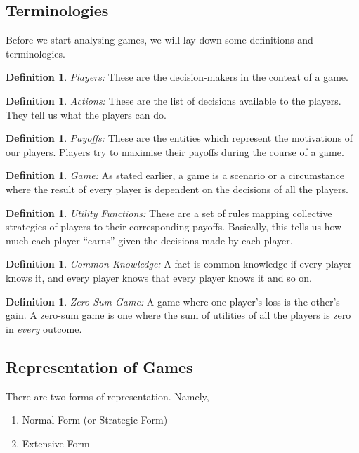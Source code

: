 \documentclass{article}
\theoremstyle{definition}
\newtheorem{defn}[theorem]{Definition}
\begin{document}
\subsection{Terminologies}

Before we start analysing games, we will lay down some definitions and terminologies.

\begin{defn}
\textit{Players:} These are the decision-makers in the context of a game. 
\end{defn}
\begin{defn}
\textit{Actions:} These are the list of decisions available to the players. They tell us what the players can do.
\end{defn}
\begin{defn}
\textit{Payoffs:} These are the entities which represent the motivations of our players. Players try to maximise their payoffs during the course of a game.
\end{defn}
\begin{defn}
\textit{Game:} As stated earlier, a game is a scenario or a circumstance where the result of every player is dependent on the decisions of all the players.
\end{defn}
\begin{defn}
\textit{Utility Functions:} These are a set of rules mapping collective strategies of players to their corresponding payoffs. Basically, this tells us how much each player ``earns'' given the decisions made by each player.
\end{defn}
\begin{defn}
\textit{Common Knowledge:} A fact is common knowledge if every player knows it, and every player knows that every player knows it and so on. 
\end{defn}
\begin{defn}
    \textit{Zero-Sum Game:} A game where one player's loss is the other's gain. A zero-sum game is one where the sum of utilities of all the players is zero in \textit{every} outcome.
\end{defn}

\subsection{Representation of Games}

There are two forms of representation. Namely, 

\begin{enumerate}
    \item Normal Form (or Strategic Form)
    \item Extensive Form
\end{enumerate}
\end{document}
